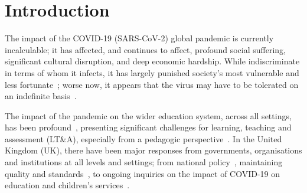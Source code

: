 \documentclass[sigconf]{acmart}
\begin{document}


\maketitle

\section{Introduction}\label{intro}

The impact of the COVID-19 (SARS-CoV-2) global pandemic is currently
incalculable; it has affected, and continues to affect, profound
social suffering, significant cultural disruption, and deep economic
hardship. While indiscriminate in terms of whom it infects, it has
largely punished society’s most vulnerable and less
fortunate~\cite{vonbraun-et-al:2020,lancetcovid:2020,vanlancker+parolin:2020};
worse now, it appears that the virus may have to be tolerated on an
indefinite basis~\cite{kissler-et-al:2020}.

The impact of the pandemic on the wider education system, across all
settings, has been
profound~\cite{unescocovidedu:2020,armitage+nellums:2020}, presenting
significant challenges for learning, teaching and assessment (LT\&A),
especially from a pedagogic
perspective~\cite{doucet-et-al:2020,oecd:2020,aace:2020}. In the
United Kingdom (UK), there have been major responses from governments,
organisations and institutions at all levels and settings; from
national policy~\cite{dfecovid:2020,wgcontinuity:2020}, maintaining
quality and standards~\cite{qaaqands:2020}, to ongoing inquiries on
the impact of COVID-19 on education and children’s
services~\cite{hocedu:2020,seneddcype:2020}.
\end{document}
